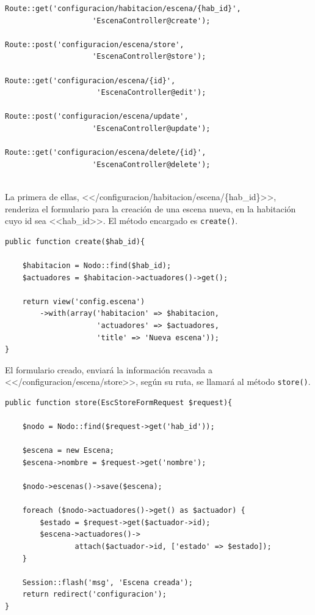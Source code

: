     \begin{lstlisting}
Route::get('configuracion/habitacion/escena/{hab_id}', 
                    'EscenaController@create');

Route::post('configuracion/escena/store', 
                    'EscenaController@store');

Route::get('configuracion/escena/{id}',
                     'EscenaController@edit');

Route::post('configuracion/escena/update', 
                    'EscenaController@update');

Route::get('configuracion/escena/delete/{id}', 
                    'EscenaController@delete');
    
    \end{lstlisting}
    
    La primera de ellas, <</configuracion/habitacion/escena/\{hab\_id\}>>, renderiza el formulario para la creación de una escena nueva, en la habitación cuyo id sea <<hab\_id>>. El método encargado es \lstinline|create()|.
    
\begin{lstlisting}
public function create($hab_id){

    $habitacion = Nodo::find($hab_id);
    $actuadores = $habitacion->actuadores()->get();
    
    return view('config.escena')
        ->with(array('habitacion' => $habitacion,
                     'actuadores' => $actuadores,
                     'title' => 'Nueva escena'));
}
\end{lstlisting}
   
   El formulario creado, enviará la información recavada a <</configuracion/escena/store>>, según su ruta, se llamará al método \lstinline|store()|.
   
   \begin{lstlisting}
public function store(EscStoreFormRequest $request){

    $nodo = Nodo::find($request->get('hab_id'));
    
    $escena = new Escena;
    $escena->nombre = $request->get('nombre');
    
    $nodo->escenas()->save($escena);
    
    foreach ($nodo->actuadores()->get() as $actuador) {
        $estado = $request->get($actuador->id);
        $escena->actuadores()->
                attach($actuador->id, ['estado' => $estado]);
    }
  
    Session::flash('msg', 'Escena creada');
    return redirect('configuracion');
}
   \end{lstlisting}
   
